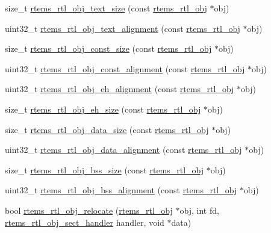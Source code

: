 \begin{DoxyCompactItemize}
\item 
size\+\_\+t \mbox{\hyperlink{rtl-obj_8c_a4df3f868b6e5b13ec7e326028683e87a}{rtems\+\_\+rtl\+\_\+obj\+\_\+text\+\_\+size}} (const \mbox{\hyperlink{structrtems__rtl__obj}{rtems\+\_\+rtl\+\_\+obj}} $\ast$obj)
\item 
uint32\+\_\+t \mbox{\hyperlink{rtl-obj_8c_a21f97e47f7caa7bb88f685f2b5b7d18b}{rtems\+\_\+rtl\+\_\+obj\+\_\+text\+\_\+alignment}} (const \mbox{\hyperlink{structrtems__rtl__obj}{rtems\+\_\+rtl\+\_\+obj}} $\ast$obj)
\item 
size\+\_\+t \mbox{\hyperlink{rtl-obj_8c_a2ce7672560ab13914b32a683650c03cf}{rtems\+\_\+rtl\+\_\+obj\+\_\+const\+\_\+size}} (const \mbox{\hyperlink{structrtems__rtl__obj}{rtems\+\_\+rtl\+\_\+obj}} $\ast$obj)
\item 
uint32\+\_\+t \mbox{\hyperlink{rtl-obj_8c_aee3ea1f29f12981579b1d1939bb9907f}{rtems\+\_\+rtl\+\_\+obj\+\_\+const\+\_\+alignment}} (const \mbox{\hyperlink{structrtems__rtl__obj}{rtems\+\_\+rtl\+\_\+obj}} $\ast$obj)
\item 
uint32\+\_\+t \mbox{\hyperlink{rtl-obj_8c_aa093ee073ed78505eab0edc5eefee8b7}{rtems\+\_\+rtl\+\_\+obj\+\_\+eh\+\_\+alignment}} (const \mbox{\hyperlink{structrtems__rtl__obj}{rtems\+\_\+rtl\+\_\+obj}} $\ast$obj)
\item 
size\+\_\+t \mbox{\hyperlink{rtl-obj_8c_a4dbc1988e76114f9d94e56f01b034901}{rtems\+\_\+rtl\+\_\+obj\+\_\+eh\+\_\+size}} (const \mbox{\hyperlink{structrtems__rtl__obj}{rtems\+\_\+rtl\+\_\+obj}} $\ast$obj)
\item 
size\+\_\+t \mbox{\hyperlink{rtl-obj_8c_a603ec80c7cf7d1a2f01f400b3e5c93d8}{rtems\+\_\+rtl\+\_\+obj\+\_\+data\+\_\+size}} (const \mbox{\hyperlink{structrtems__rtl__obj}{rtems\+\_\+rtl\+\_\+obj}} $\ast$obj)
\item 
uint32\+\_\+t \mbox{\hyperlink{rtl-obj_8c_a9a3dae296e05206c99846c099789becc}{rtems\+\_\+rtl\+\_\+obj\+\_\+data\+\_\+alignment}} (const \mbox{\hyperlink{structrtems__rtl__obj}{rtems\+\_\+rtl\+\_\+obj}} $\ast$obj)
\item 
size\+\_\+t \mbox{\hyperlink{rtl-obj_8c_a6125a7787e7b842bc39aa69370b7db2b}{rtems\+\_\+rtl\+\_\+obj\+\_\+bss\+\_\+size}} (const \mbox{\hyperlink{structrtems__rtl__obj}{rtems\+\_\+rtl\+\_\+obj}} $\ast$obj)
\item 
uint32\+\_\+t \mbox{\hyperlink{rtl-obj_8c_a02b040b6c3f07084733c2cb226e98fb8}{rtems\+\_\+rtl\+\_\+obj\+\_\+bss\+\_\+alignment}} (const \mbox{\hyperlink{structrtems__rtl__obj}{rtems\+\_\+rtl\+\_\+obj}} $\ast$obj)
\item 
bool \mbox{\hyperlink{rtl-obj_8c_a39ef15efbb0f5eddd01c677d77d9c33e}{rtems\+\_\+rtl\+\_\+obj\+\_\+relocate}} (\mbox{\hyperlink{structrtems__rtl__obj}{rtems\+\_\+rtl\+\_\+obj}} $\ast$obj, int fd, \mbox{\hyperlink{rtl-obj_8h_a7af5827cf336da33eef4564a6e00ba11}{rtems\+\_\+rtl\+\_\+obj\+\_\+sect\+\_\+handler}} handler, void $\ast$data)

\end{DoxyCompactItemize}

